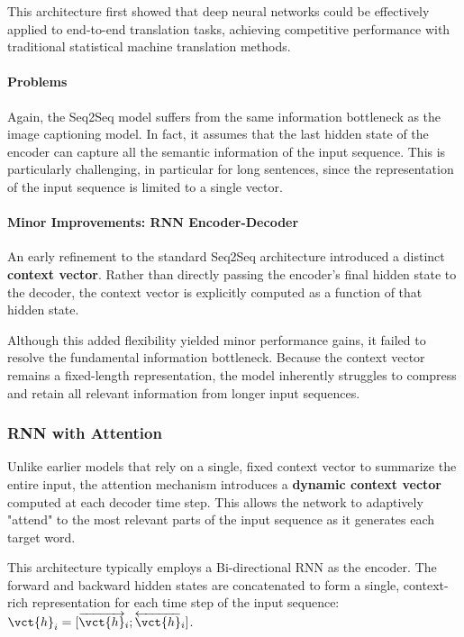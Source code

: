This architecture first showed that deep neural networks could be effectively applied to end-to-end translation tasks,
achieving competitive performance with traditional statistical machine translation methods.

\paragraph{Problems}
Again, the Seq2Seq model suffers from the same information bottleneck as the image captioning model. In fact, it assumes that the
last hidden state of the encoder can capture all the semantic information of the input sequence.
This is particularly challenging, in particular for long sentences, since the representation of the input sequence is limited to a single vector.

\paragraph{Minor Improvements: RNN Encoder-Decoder}
An early refinement to the standard Seq2Seq architecture introduced a distinct \textbf{context vector}. Rather than directly passing the encoder's final hidden state to the decoder, the context vector is explicitly computed as a function of that hidden state.

Although this added flexibility yielded minor performance gains, it failed to resolve the fundamental information bottleneck. Because the context vector remains a fixed-length representation, the model inherently struggles to compress and retain all relevant information from longer input sequences.

\subsubsection{RNN with Attention}

Unlike earlier models that rely on a single, fixed context vector to summarize the entire input, the attention mechanism introduces a \textbf{dynamic context vector} computed at each decoder time step.
This allows the network to adaptively "attend" to the most relevant parts of the input sequence as it generates each target word.

This architecture typically employs a Bi-directional RNN as the encoder.
The forward and backward hidden states are concatenated to form a single, context-rich representation for each time step of the input sequence: $\vct{h}_i = [\overrightarrow{\vct{h}}_i; \overleftarrow{\vct{h}}_i]$.


